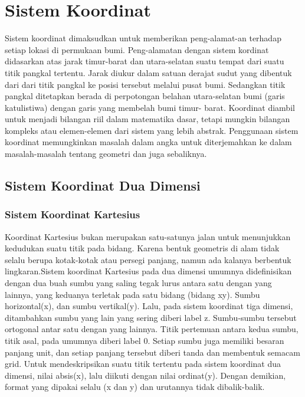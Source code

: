 \section{Sistem Koordinat}

Sistem koordinat dimaksudkan untuk memberikan peng-alamat-an terhadap setiap lokasi di permukaan bumi. Peng-alamatan dengan sistem kordinat didasarkan atas jarak timur-barat dan utara-selatan suatu tempat dari suatu titik pangkal tertentu. Jarak diukur dalam satuan derajat sudut yang dibentuk dari dari titik pangkal ke posisi tersebut melalui pusat bumi. Sedangkan titik pangkal ditetapkan berada di
perpotongan belahan utara-selatan bumi (garis katulistiwa) dengan garis yang membelah bumi timur- barat\cite{zuhdi2012sistem}. Koordinat diambil untuk menjadi bilangan riil dalam matematika dasar, tetapi mungkin bilangan kompleks atau elemen-elemen dari sistem yang lebih abstrak. Penggunaan sistem koordinat memungkinkan masalah dalam angka untuk diterjemahkan ke dalam masalah-masalah tentang geometri dan juga sebaliknya.

\subsection{Sistem Koordinat Dua Dimensi}
\subsubsection{Sistem Koordinat Kartesius}
Koordinat Kartesius bukan merupakan satu-satunya jalan untuk menunjukkan kedudukan suatu titik pada bidang. Karena bentuk geometris di alam tidak selalu berupa kotak-kotak atau persegi panjang, namun ada kalanya berbentuk lingkaran\cite{mufidah2015solusi}.Sistem koordinat Kartesius pada dua dimensi umumnya didefinisikan dengan dua buah sumbu yang saling tegak lurus antara satu dengan yang lainnya, yang keduanya terletak pada satu bidang (bidang xy). Sumbu horizontal(x), dan sumbu vertikal(y). Lalu, pada sistem koordinat tiga dimensi, ditambahkan sumbu yang lain yang sering diberi label z. Sumbu-sumbu tersebut ortogonal antar satu dengan yang lainnya. Titik pertemuan antara kedua sumbu, titik asal, pada umumnya diberi label 0. Setiap sumbu juga memiliki besaran panjang unit, dan setiap panjang tersebut diberi tanda dan membentuk semacam grid. Untuk mendeskripsikan suatu titik tertentu pada sistem koordinat dua dimensi, nilai absis(x), lalu diikuti dengan nilai ordinat(y). Dengan demikian, format yang dipakai selalu (x dan y) dan urutannya tidak dibalik-balik.


